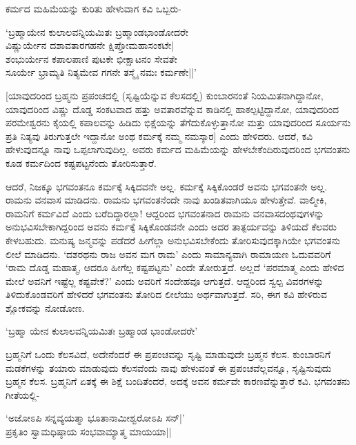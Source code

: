 ಕರ್ಮದ ಮಹಿಮೆಯನ್ನು ಕುರಿತು ಹೇಳುವಾಗ ಕವಿ ಒಬ್ಬರು-

\begin{shloka}
`ಬ್ರಹ್ಮಾಯೇನ ಕುಲಾಲವನ್ನಿಯಮಿತಃ ಬ್ರಹ್ಮಾಂಡಭಾಂಡೋದರೇ\\
ವಿಷ್ಣುರ್ಯೇನ ದಶಾವತಾರಗಹನೇ ಕ್ಷಿಪ್ತೋಮಹಾಸಂಕಟೇ|\\
ಶಂಭುರ್ಯೇನ ಕಪಾಲಪಾಣಿ ಪುಟಕೇ ಭೀಕ್ಷಾಟನಂ ಸೇವತೇ\\
ಸೂರ್ಯೇ ಭ್ರಾಮ್ಯತಿ ನಿತ್ಯಮೇವ ಗಗನೇ ತಸ್ಮೈ ನಮಃ ಕರ್ಮಣೇ||'
\end{shloka}

[ಯಾವುದರಿಂದ ಬ್ರಹ್ಮನು ಪ್ರಪಂಚದಲ್ಲಿ (ಸೃಷ್ಟಿಯೆನ್ನುವ ಕೆಲಸದಲ್ಲಿ) ಕುಂಬಾರನಂತೆ ನಿಯಮಿತನಾಗಿದ್ದಾನೋ, ಯಾವುದರಿಂದ ವಿಷ್ಣು ದೊಡ್ಡ ಸಂಕಟವಾದ ಹತ್ತು ಅವತಾರವೆನ್ನುವ ಕಾಡಿನಲ್ಲಿ ಹಾಕಲ್ಪಟ್ಟಿದ್ದಾನೋ, ಯಾವುದರಿಂದ ಪರಮೇಶ್ವರನು ಕೈಯಲ್ಲಿ ಕಪಾಲವನ್ನು ಹಿಡಿದು ಭಿಕ್ಷೆಯನ್ನು ತೆಗೆದುಕೊಳ್ಳುತ್ತಾನೋ ಮತ್ತು ಯಾವುದರಿಂದ ಸೂರ್ಯನು ಪ್ರತಿ ನಿತ್ಯವು ತಿರುಗುತ್ತಲೇ ಇದ್ದಾನೋ ಅಂಥ ಕರ್ಮಕ್ಕೆ ನಮ್ಮ ನಮಸ್ಕಾರ] ಎಂದು ಹೇಳಿದರು. ಆದರೆ, ಕವಿ ಹೇಳುವುದನ್ನೂ ನಾವು ಒಪ್ಪಲಾಗುವುದಿಲ್ಲ. ಅವರು ಕರ್ಮದ ಮಹಿಮೆಯನ್ನು ಹೇಳಬೇಕೆಂದಿರುವುದರಿಂದ ಭಗವಂತನು ಕೂಡ ಕರ್ಮದಿಂದ ಕಷ್ಟಪಟ್ಟನೆಂದು ತೋರಿಸುತ್ತಾರೆ.

ಆದರೆ, ನಿಜಕ್ಕೂ ಭಗವಂತನೂ ಕರ್ಮಕ್ಕೆ ಸಿಕ್ಕಿದವನೇ ಅಲ್ಲ. ಕರ್ಮಕ್ಕೆ  ಸಿಕ್ಕಿಕೊಂಡರೆ ಅವನು ಭಗವಂತನೇ ಅಲ್ಲ. ರಾಮನು ವನವಾಸ ಮಾಡಿದನು. ರಾಮನು ಭಗವಂತನೆಂದೇ ನಾವು ಖಂಡಿತವಾಗಿಯೂ ಹೇಳುತ್ತೇವೆ. ವಾಲ್ಮೀಕಿ, ರಾಮನಿಗೆ ಕರ್ಮವಿದೆ ಎಂದು ಬರೆದಿದ್ದಾರಲ್ಲಾ! ಆದ್ದರಿಂದ ಭಗವಂತನಾದ ರಾಮನು ವನವಾಸದಂಥವುಗಳನ್ನು ಅನುಭವಿಸಬೇಕಾಗಿದ್ದರಿಂದ ಅವನು ಕರ್ಮಕ್ಕೆ ಸಿಕ್ಕಿಕೊಂಡವನೇ ಎಂದು ಅದರ ತಾತ್ಪರ್ಯವನ್ನು ತಿಳಿಯದೆ ಕೆಲವರು ಕೇಳಬಹುದು. ಮನುಷ್ಯ ಜನ್ಮವನ್ನು ಪಡೆದರೆ ಹೀಗೆಲ್ಲಾ ಅನುಭವಿಸಬೇಕೆಂದು ತೋರಿಸುವುದಕ್ಕಾಗಿಯೇ ಭಗವಂತನು ಲೀಲೆ ಮಾಡಿದನು. `ದಶರಥನು ರಾಜ ಅವನ ಮಗ ರಾಮ' ಎಂದು ಸಾಮಾನ್ಯವಾಗಿ ರಾಮಾಯಣ ಓದುವವರಿಗೆ `ರಾಮ ದೊಡ್ಡ ಮಹಾತ್ಮ, ಆದರೂ ಹೀಗೆಲ್ಲ ಕಷ್ಟಪಟ್ಟನು' ಎಂದೇ ತೋರುತ್ತದೆ. ಅಲ್ಲದೆ `ಪರಮಾತ್ಮ ಎಂದು ಹೇಳಿದ ಮೇಲೆ ಅವನಿಗೆ ಇಷ್ಟೆಲ್ಲ ಕಷ್ಟವೇಕೆ?' ಎಂದು ಅವರಿಗೆ ಸಂದೇಹವೂ ಆಗುತ್ತದೆ. ಆದ್ದರಿಂದ ಸ್ವಲ್ಪ ವಿವರಗಳನ್ನು ತಿಳಿದುಕೊಂಡವರಿಗೆ ಹೇಳಿದರೆ ಭಗವಂತನು ತೋರಿದ ಲೀಲೆಯು ಅರ್ಥವಾಗುತ್ತದೆ. ಸರಿ, ಈಗ ಕವಿ ಹೇಳಿರುವ ಶ್ಲೋಕವನ್ನು ನೋಡೋಣ.

\begin{shloka}
`ಬ್ರಹ್ಮಾ ಯೇನ ಕುಲಾಲವನ್ನಿಯಮಿತಃ ಬ್ರಹ್ಮಾಂಡ ಭಾಂಡೋದರೇ'
\end{shloka}

ಬ್ರಹ್ಮನಿಗೆ ಒಂದು ಕೆಲಸವಿದೆ, ಅದೇನೆಂದರೆ ಈ ಪ್ರಪಂಚವನ್ನು ಸೃಷ್ಟಿ ಮಾಡುವುದೇ ಬ್ರಹ್ಮನ ಕೆಲಸ. ಕುಂಬಾರನಿಗೆ ಮಡಕೆಗಳನ್ನು ತಯಾರು ಮಾಡುವುದು ಕೆಲಸವೆಂದು ನಾವು ಹೇಳುವಂತೆ ಈ ಪ್ರಪಂಚವೆಲ್ಲವನ್ನೂ, ಸೃಷ್ಟಿಸುವುದು ಬ್ರಹ್ಮನ ಕೆಲಸ. ಬ್ರಹ್ಮನಿಗೆ ಏತಕ್ಕೆ ಈ ಶಿಕ್ಷೆ ಬಂದಿತೆಂದರೆ, ಅದಕ್ಕೆ ಅವನ ಕರ್ಮವೇ ಕಾರಣವೆನ್ನುತ್ತಾರೆ ಕವಿ. ಭಗವಂತನು ಗೀತೆಯಲ್ಲಿ-

\begin{shloka}
`ಅಜೋಽಪಿ ಸನ್ನವ್ಯಯತ್ಮಾ ಭೂತಾನಾಮೀಶ್ವರೋಽಪಿ ಸನ್|'\\
ಪ್ರಕೃತಿಂ ಸ್ವಾಮಧಿಷ್ಠಾಯ ಸಂಭವಾಮ್ಯಾತ್ಮ ಮಾಯಯಾ||
\end{shloka}

